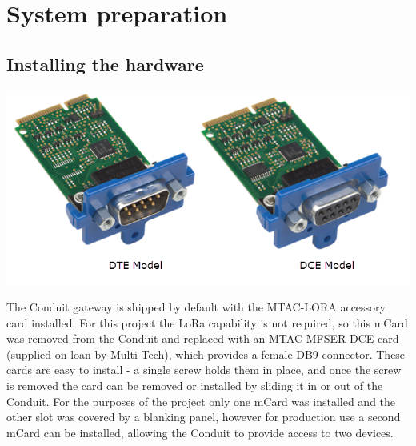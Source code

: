 \section{System preparation}
\label{section:dev-sysprep}
\subsection{Installing the hardware}
\label{subsection:dev-sysprep-hardware}
\begin{center}
    \includegraphics[scale=0.7]{img/4-development/multitech-mtac-mfser.png}
    \label{fig:4-mfser}
\end{center}
The Conduit gateway is shipped by default with the MTAC-LORA accessory card installed. For this project the LoRa capability is not required, so this mCard was removed from the Conduit and replaced with an MTAC-MFSER-DCE card (supplied on loan by Multi-Tech), which provides a female DB9 connector. These cards are easy to install - a single screw holds them in place, and once the screw is removed the card can be removed or installed by sliding it in or out of the Conduit. For the purposes of the project only one mCard was installed and the other slot was covered by a blanking panel, however for production use a second mCard can be installed, allowing the Conduit to provide access to two devices.

